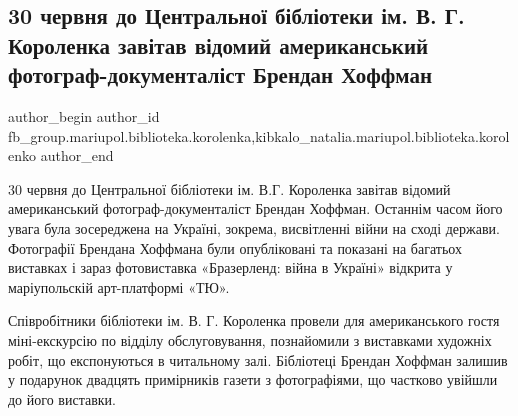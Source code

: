  
 
 
 
 

\subsection{30 червня до Центральної бібліотеки ім. В. Г. Короленка завітав відомий американський фотограф-документаліст Брендан Хоффман}
\label{sec:30_06_2018.fb.fb_group.mariupol.biblioteka.korolenka.1.30_chervnya_do_tsent}
 
\ifcmt
 author_begin
   author_id fb_group.mariupol.biblioteka.korolenka,kibkalo_natalia.mariupol.biblioteka.korolenko
 author_end
\fi

30 червня до Центральної бібліотеки ім. В.Г. Короленка завітав відомий
американський фотограф-документаліст Брендан Хоффман. Останнім часом його увага
була зосереджена на Україні, зокрема, висвітленні війни на сході держави.
Фотографії Брендана Хоффмана були опубліковані та  показані на багатьох
виставках і зараз фотовиставка «Бразерленд: війна в Україні» відкрита у
маріупольскій арт-платформі «ТЮ». 

Співробітники бібліотеки ім. В. Г. Короленка провели для американського гостя
міні-екскурсію по відділу обслуговування, познайомили з виставками художніх
робіт, що експонуються в читальному залі. Бібліотеці Брендан Хоффман залишив у
подарунок двадцять примірників газети з фотографіями, що частково увійшли до
його виставки.

